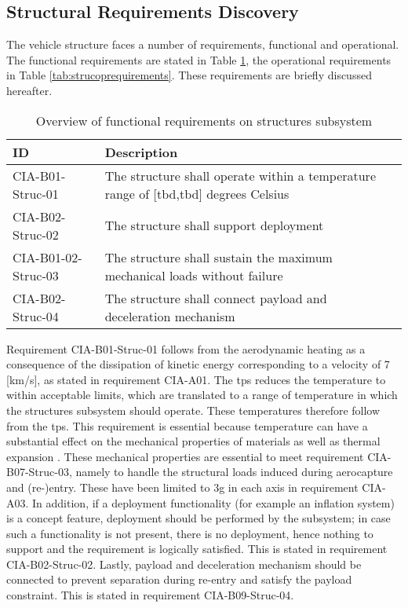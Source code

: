 \subsection{Structural Requirements Discovery} \label{sec:struct}
The vehicle structure faces a number of requirements, functional and operational. The functional requirements are stated in Table \ref{tab:strucfuncrequirements}, the operational requirements in Table \ref{tab:strucoprequirements}. These requirements are briefly discussed hereafter.
\begin{table}[H]
	\caption{Overview of functional requirements on structures subsystem}
	\begin{tabular}{|p{}|p{}|}
    \hline
    ID          & Description                                                                                                      \\ \hline \hline
    CIA-B01-Struc-01 & The structure shall operate within a temperature range of [\gls{tbd},\gls{tbd}] degrees Celsius           \\ \hline
    CIA-B02-Struc-02 & The structure shall support deployment \\ \hline
    CIA-B01-02-Struc-03 & The structure shall sustain the maximum mechanical loads without failure                           \\ \hline
    CIA-B02-Struc-04 & The structure shall connect payload and deceleration mechanism \\ \hline
    \end{tabular}
    \label{tab:strucfuncrequirements}
\end{table}
Requirement CIA-B01-Struc-01 follows from the aerodynamic heating as a consequence of the dissipation of kinetic energy corresponding to a velocity of 7 [km/s], as stated in requirement CIA-A01. The \gls{tps} reduces the temperature to within acceptable limits, which are translated to a range of temperature in which the structures subsystem should operate. These temperatures therefore follow from the \gls{tps}. This requirement is essential because temperature can have a substantial effect on the mechanical properties of materials as well as thermal expansion \cite{Callister2007}. These mechanical properties are essential to meet requirement CIA-B07-Struc-03, namely to handle the structural loads induced during aerocapture and (re-)entry. These have been limited to 3g in each axis in requirement CIA-A03. In addition, if a deployment functionality  (for example an inflation system) is a concept feature, deployment should be performed by the subsystem; in case such a functionality is not present, there is no deployment, hence nothing to support and the requirement is logically satisfied. This is stated in requirement CIA-B02-Struc-02. Lastly, payload and deceleration mechanism should be connected to prevent separation during re-entry and satisfy the payload constraint. This is stated in requirement CIA-B09-Struc-04.

